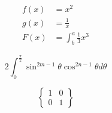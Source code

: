 \documentclass{article}
\begin{document}
\begin{align*}
f(x) &= x^2\\
g(x) &= \frac{1}{x}\\
F(x) &= \int^a_b \frac{1}{3}x^3
\end{align*}


\[2\int_{0}^{\frac{\pi}{2}}\sin^{2m-1}{\theta}\cos^{2n-1}{\theta}d\theta\]

\[\left\{\begin{matrix}
    1 & 0\\
    0 & 1
    \end{matrix}\right\}\]
\end{document}
